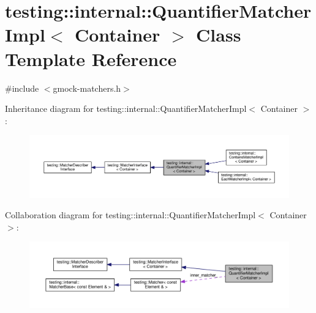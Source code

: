 \hypertarget{classtesting_1_1internal_1_1QuantifierMatcherImpl}{}\section{testing\+:\+:internal\+:\+:Quantifier\+Matcher\+Impl$<$ Container $>$ Class Template Reference}
\label{classtesting_1_1internal_1_1QuantifierMatcherImpl}


{\ttfamily \#include $<$gmock-\/matchers.\+h$>$}



Inheritance diagram for testing\+:\+:internal\+:\+:Quantifier\+Matcher\+Impl$<$ Container $>$\+:\nopagebreak
\begin{figure}[H]
\begin{center}
\leavevmode
\includegraphics[width=350pt]{classtesting_1_1internal_1_1QuantifierMatcherImpl__inherit__graph}
\end{center}
\end{figure}


Collaboration diagram for testing\+:\+:internal\+:\+:Quantifier\+Matcher\+Impl$<$ Container $>$\+:\nopagebreak
\begin{figure}[H]
\begin{center}
\leavevmode
\includegraphics[width=350pt]{classtesting_1_1internal_1_1QuantifierMatcherImpl__coll__graph}
\end{center}
\end{figure}

